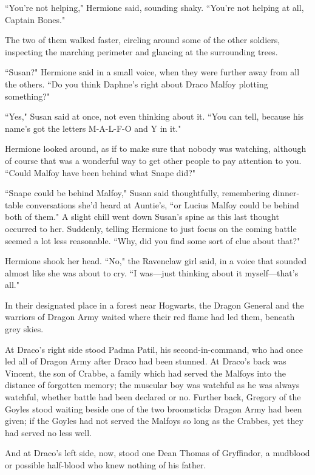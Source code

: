 ``You're not helping," Hermione said, sounding shaky. ``You're not helping at all, Captain Bones."

The two of them walked faster, circling around some of the other soldiers, inspecting the marching perimeter and glancing at the surrounding trees.

``Susan?" Hermione said in a small voice, when they were further away from all the others. ``Do you think Daphne's right about Draco Malfoy plotting something?"

``Yes," Susan said at once, not even thinking about it. ``You can tell, because his name's got the letters M-A-L-F-O and Y in it."

Hermione looked around, as if to make sure that nobody was watching, although of course that was a wonderful way to get other people to pay attention to you. ``Could Malfoy have been behind what Snape did?"

``Snape could be behind Malfoy," Susan said thoughtfully, remembering dinner-table conversations she'd heard at Auntie's, ``or Lucius Malfoy could be behind both of them." A slight chill went down Susan's spine as this last thought occurred to her. Suddenly, telling Hermione to just focus on the coming battle seemed a lot less reasonable. ``Why, did you find some sort of clue about that?"

Hermione shook her head. ``No," the Ravenclaw girl said, in a voice that sounded almost like she was about to cry. ``I was—just thinking about it myself—that's all."

\later

In their designated place in a forest near Hogwarts, the Dragon General and the warriors of Dragon Army waited where their red flame had led them, beneath grey skies.

At Draco's right side stood Padma Patil, his second-in-command, who had once led all of Dragon Army after Draco had been stunned. At Draco's back was Vincent, the son of Crabbe, a family which had served the Malfoys into the distance of forgotten memory; the muscular boy was watchful as he was always watchful, whether battle had been declared or no. Further back, Gregory of the Goyles stood waiting beside one of the two broomsticks Dragon Army had been given; if the Goyles had not served the Malfoys so long as the Crabbes, yet they had served no less well.

And at Draco's left side, now, stood one Dean Thomas of Gryffindor, a mudblood or possible half-blood who knew nothing of his father.

